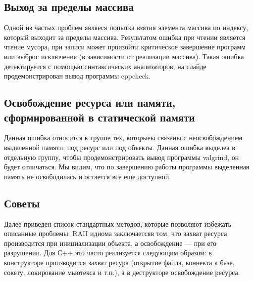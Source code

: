 \documentclass[10pt]{article}
\begin{document}
\subsection{Выход за пределы массива}
Одной из частых проблем являеся попытка взятия элемента массива по индексу, который
выходит за пределы массива. Результатом ошибка при чтении является чтение мусора, при записи
может произойти критическое завершение программ или выброс исключения (в зависимости от реализации массива).
Такая ошибка детектируется с помощью синтаксических анализаторов, на слайде продемонстрирован вывод программы
cppcheck.

\subsection{Освобождение ресурса или памяти, сформированной в статической памяти}
Данная ошибка относится к группе тех, которыеы связаны с неосвобождением выделенной памяти,
под ресурс или под объекты. Данная ошибка выделеа в отдельную группу, чтобы продемонстрировать
вывод программы valgrind, он будет отличаться. Мы видим, что по завершению работы программы
выделенная память не освободилась и остается все еще доступной.

\subsection{Советы}
Далее приведен список стандартных методов, которые позволяют избежать 
описанные проблемы. RAII идиома заключаетсяв том, что захват ресурса производится при инициализации
объекта, а освобождение --- при его разрушении. Для С++ это часто реализуется следующим образом:
в конструкторе производится захват ресура (открытие файла, коннекта к базе, сокету, локирование мьютекса и т.п.),
а в деструкторе освобождение ресурса.
\end{document}
